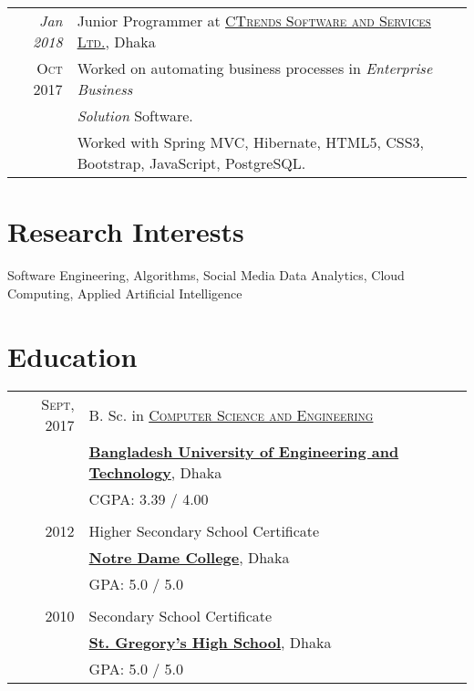 \documentclass[a4paper,10pt]{article}
\begin{document}
\begin{tabular}{r|p{11cm}}
 \emph{Jan 2018} & Junior Programmer at \href{http://www.ctrends-software.com}{\textsc{CTrends Software and Services Ltd.}}, Dhaka \\\textsc{Oct 2017} & Worked on automating business processes in \emph{Enterprise Business} \\ & \emph{Solution} Software.\\
 & Worked with Spring MVC, Hibernate, HTML5, CSS3, Bootstrap, JavaScript, PostgreSQL.
\end{tabular}

\section{Research Interests}
Software Engineering, Algorithms,  Social Media Data Analytics, Cloud Computing, Applied Artificial Intelligence

\section{Education}
\begin{tabular}{rl} 
 \textsc{Sept}, 2017 & B. Sc. in \href{https://cse.buet.ac.bd/}{\textsc{Computer Science and Engineering}} \\
 & \href{http://www.buet.ac.bd/}{\textbf{Bangladesh University of Engineering and Technology}}, Dhaka \\
& \normalsize \textsc{CGPA}: 3.39 / 4.00 \\

&\\

2012 & Higher Secondary School Certificate \\
 & \href{http://www.notredamecollege-dhaka.com/}{\textbf{Notre Dame College}}, Dhaka \\
 & \normalsize \textsc{GPA}: 5.0 / 5.0 \\
&\\

2010 & Secondary School Certificate \\
 & \href{http://www.sghsbd.com/}{\textbf{St. Gregory's High School}}, Dhaka \\
 & \normalsize \textsc{GPA}: 5.0 / 5.0 \\

\end{tabular}
\end{document}
